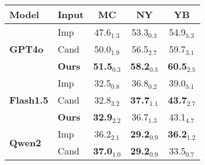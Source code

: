 \begin{table}[h]
    \small
    \centering
    \begin{tabular}{ll|ccc}
    \toprule
\textbf{Model} & \textbf{Input}  & \textbf{MC} & \textbf{NY} & \textbf{YB} \\ \midrule
\multirow{3}{*}{\textbf{GPT4o}} & 
Imp  & 
 47.6$_{1.3}$ & 
 53.3$_{0.3}$ & 
 54.9$_{5.3}$\\ 
 
 & Cand  & 
 50.0$_{1.9}$ & 
 56.5$_{2.7}$ & 
 59.7$_{3.1}$\\ 
 
 &  \textbf{Ours}  & 
 \textbf{51.5}$_{0.3}$ & 
 \textbf{58.2}$_{0.5}$ & 
 \textbf{60.5}$_{2.5}$ \\ \midrule
 
\multirow{3}{*}{\textbf{Flash1.5}} & 
Imp  & 
 32.5$_{0.8}$ & 
 36.8$_{0.2}$ & 
 39.0$_{5.1}$\\ 
 
 & Cand  & 
 32.8$_{3.2}$ & 
 \textbf{37.7}$_{1.1}$ & 
 \textbf{43.7}$_{2.7}$\\ 
 
 & \textbf{Ours}  & 
 \textbf{32.9}$_{2.2}$ & 
 36.7$_{1.3}$ & 
 43.1$_{4.7}$\\ \midrule
 
\multirow{3}{*}{\textbf{Qwen2}} & 
Imp  & 
36.2$_{2.1}$ & 
 \textbf{29.2}$_{0.9}$ & 
 \textbf{36.2}$_{1.2}$\\ 
 
 & Cand  & 
 \textbf{37.0}$_{1.0}$ & 
 \textbf{29.2}$_{0.9}$ & 
 33.5$_{0.7}$\\ 
 

\end{tabular}
\end{table}
